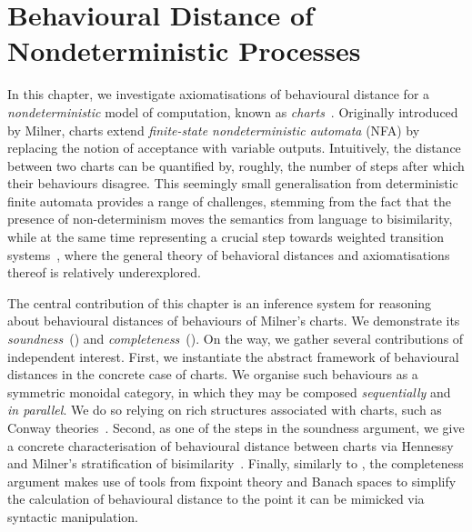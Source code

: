\chapter{Behavioural Distance of Nondeterministic Processes}
\label{chapter3}

In this chapter, we investigate axiomatisations of behavioural distance for a {\em nondeterministic} model of computation, known as \emph{charts}~\cite{Milner:1984:Complete}. Originally introduced by Milner, charts extend \emph{finite-state nondeterministic automata} (NFA) by replacing the notion of acceptance with variable outputs. Intuitively, the distance between two charts can be quantified by, roughly, the number of steps after which their behaviours disagree. This seemingly small generalisation from deterministic finite automata provides a range of challenges, stemming from the fact that the presence of non-determinism moves the semantics from language to bisimilarity, while at the same time representing a crucial step towards weighted transition systems~\cite{Larsen:2011:Metrics}, where the general theory of behavioral distances and axiomatisations thereof is relatively underexplored. 


The central contribution of this chapter is an inference system for reasoning about behavioural distances of behaviours of Milner's charts. We demonstrate its \emph{soundness}~() and \emph{completeness}~(). On the way, we gather several contributions of independent interest. First, we instantiate the abstract framework of behavioural distances in the concrete case of charts. We organise such behaviours as a symmetric monoidal category, in which they may be composed \emph{sequentially} and \emph{in parallel}. We do so relying on rich structures associated with charts, such as Conway theories~\cite{Bloom:1993:Iteration,Esik:1999:Group}. Second, as one of the steps in the soundness argument, we give a concrete characterisation of behavioural distance between charts via Hennessy and Milner's stratification of bisimilarity~\cite{hennessy:1985:algebraic}. Finally, similarly to , the completeness argument makes use of tools from fixpoint theory and Banach spaces to simplify the calculation of behavioural distance to the point it can be mimicked via syntactic manipulation.

